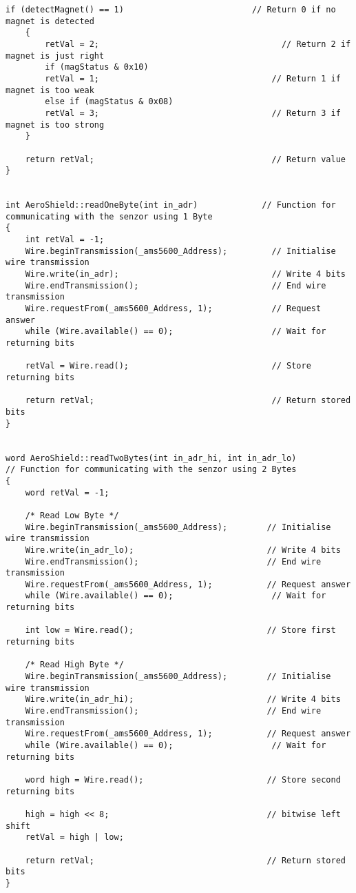 \begin{lstlisting}[caption={Zdrojový kód súboru AeroShield.cpp.},captionpos=b]
	if (detectMagnet() == 1)                          // Return 0 if no magnet is detected
	{
		retVal = 2;                                     // Return 2 if magnet is just right
		if (magStatus & 0x10)
		retVal = 1;                                   // Return 1 if magnet is too weak
		else if (magStatus & 0x08)
		retVal = 3;                                   // Return 3 if magnet is too strong
	}
	
	return retVal;                                    // Return value 
}


int AeroShield::readOneByte(int in_adr)             // Function for communicating with the senzor using 1 Byte 
{
	int retVal = -1;
	Wire.beginTransmission(_ams5600_Address);         // Initialise wire transmission 
	Wire.write(in_adr);                               // Write 4 bits 
	Wire.endTransmission();                           // End wire transmission 
	Wire.requestFrom(_ams5600_Address, 1);            // Request answer  
	while (Wire.available() == 0);                    // Wait for returning bits 
	
	retVal = Wire.read();                             // Store returning bits 
	
	return retVal;                                    // Return stored bits 
}


word AeroShield::readTwoBytes(int in_adr_hi, int in_adr_lo)          // Function for communicating with the senzor using 2 Bytes 
{
	word retVal = -1;
	
	/* Read Low Byte */
	Wire.beginTransmission(_ams5600_Address);        // Initialise wire transmission 
	Wire.write(in_adr_lo);                           // Write 4 bits 
	Wire.endTransmission();                          // End wire transmission 
	Wire.requestFrom(_ams5600_Address, 1);           // Request answer  
	while (Wire.available() == 0);                    // Wait for returning bits 
	
	int low = Wire.read();                           // Store first returning bits 
	
	/* Read High Byte */
	Wire.beginTransmission(_ams5600_Address);        // Initialise wire transmission 
	Wire.write(in_adr_hi);                           // Write 4 bits   
	Wire.endTransmission();                          // End wire transmission 
	Wire.requestFrom(_ams5600_Address, 1);           // Request answer  
	while (Wire.available() == 0);                    // Wait for returning bits 
	
	word high = Wire.read();                         // Store second returning bits 
	
	high = high << 8;                                // bitwise left shift
	retVal = high | low;
	
	return retVal;                                   // Return stored bits 
}	
\end{lstlisting}